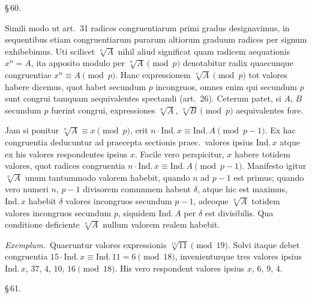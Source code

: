 \documentclass[12pt,a4paper]{article}
\theoremstyle{plain}
\theoremstyle{definition}
\theoremstyle{remark}
\begin{document}
\begin{center}\S\,60.\end{center}

Simili modo ut art.~31 radices congruentiarum primi gradus designavimus, in sequentibus etiam congruentiarum purarum altiorum graduum radices per signum exhibebimus. Uti scilicet $\sqrt[n]{A}$ nihil aliud significat quam radicem aequationis $x^n = A$, ita apposito modulo per $\sqrt[n]{A} \pmod{p}$ denotabitur radix quaecunque congruentiae $x^n \equiv A \pmod{p}$. Hanc expressionem $\sqrt[n]{A} \pmod{p}$ tot valores habere dicemus, quot habet secundum $p$ incongruos, omnes enim qui secundum $p$ sunt congrui tamquam aequivalentes spectandi (art.~26). Ceterum patet, si $A$, $B$ secundum $p$ fuerint congrui, expressiones $\sqrt[n]{A}$, $\sqrt[n]{B} \pmod{p}$ aequivalentes fore.

Jam si ponitur $\sqrt[n]{A} \equiv x \pmod{p}$, erit $n \cdot \text{Ind.}\,x \equiv \text{Ind.}\,A \pmod{p-1}$. Ex hac congruentia deducuntur ad praecepta sectionis praec.\ valores ipsius $\text{Ind.}\,x$ atque ex his valores respondentes ipsius $x$. Facile vero perspicitur, $x$ habere totidem valores, quot radices congruentia $n \cdot \text{Ind.}\,x \equiv \text{Ind.}\,A \pmod{p-1}$. Manifesto igitur $\sqrt[n]{A}$ unum tantummodo valorem habebit, quando $n$ ad $p-1$ est primus; quando vero numeri $n$, $p-1$ divisorem communem habent $\delta$, atque hic est maximus, $\text{Ind.}\,x$ habebit $\delta$ valores incongruos secundum $p-1$, adeoque $\sqrt[n]{A}$ totidem valores incongruos secundum $p$, siquidem $\text{Ind.}\,A$ per $\delta$ est divisibilis. Qua conditione deficiente $\sqrt[n]{A}$ nullum valorem realem habebit.

\textit{Exemplum.}\ Quaeruntur valores expressionis $\sqrt[15]{11} \pmod{19}$. Solvi itaque debet congruentia $15 \cdot \text{Ind.}\,x \equiv \text{Ind.}\,11 = 6 \pmod{18}$, invenienturque tres valores ipsius $\text{Ind.}\,x$, $37$, $4$, $10$, $16 \pmod{18}$. His vero respondent valores ipsius $x$, $6$, $9$, $4$.

\begin{center}\S\,61.\end{center}
\end{document}
